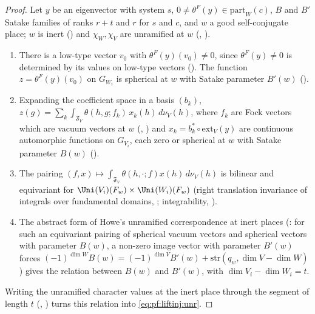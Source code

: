 \begin{proof}
Let $y$ be an eigenvector with system $s$, $0\ne\theta^F(y)\in\mathrm{part}_W(c)$, $B$ and $B'$ Satake families of ranks $r+t$ and $r$
for $s$ and $c$, and $w$ a good self-conjugate place; $w$ is inert () and $\chi_W,\chi_V$
are unramified at $w$ (, ).
\begin{enumerate}[label=\arabic*.]
\item There is a low-type vector $v_0$ with $\theta^F(y)(v_0)\ne0$, since $\theta^F(y)\ne0$ is determined by its values on low-type
vectors (). The function $z=\theta^F(y)(v_0)$ on $G_{W_i}$ is spherical at
$w$ with Satake parameter $B'(w)$ ().
\item Expanding the coefficient space in a basis $(b_k)$, $z(g)=\sum_k\int_{\mathfrak F_V}\theta(h,g;f_k)\,x_k(h)\,d\nu_V(h)$, where
$f_k$ are Fock vectors which are vacuum vectors at $w$ (,
) and $x_k=b_k^*\circ\mathrm{ext}_V(y)$ are continuous automorphic functions on
$G_{V_i}$, each zero or spherical at $w$ with Satake parameter $B(w)$ ().
\item The pairing $(f,x)\mapsto\int_{\mathfrak F_V}\theta(h,\cdot;f)x(h)\,d\nu_V(h)$ is bilinear and equivariant for
$\Uni(V_i)(F_w)\times\Uni(W_i)(F_w)$ (right translation invariance of integrals over fundamental domains,
; integrability,
).
\item The abstract form of Howe's unramified correspondence at inert places
(: for such an equivariant pairing of spherical vacuum vectors and spherical vectors with
parameter $B(w)$, a non-zero image vector with parameter $B'(w)$ forces $(-1)^{\dim W}B(w)=(-1)^{\dim V}B'(w)+\mathrm{str}(q_w,\dim V-\dim W)$)
gives the relation between $B(w)$ and $B'(w)$, with $\dim V_i-\dim W_i=t$.
\end{enumerate}
Writing the unramified character values at the inert place through the segment of length $t$
(, ) turns this relation into
\eqref{eq:pf:liftinj:unr}.
\end{proof}

